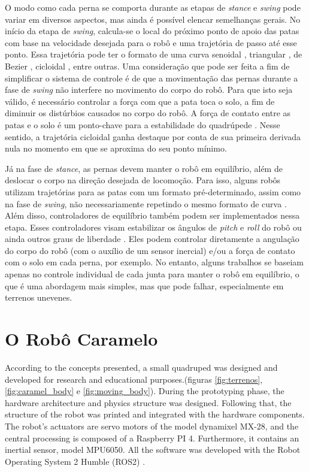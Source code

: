 \documentclass[conference]{IEEEtran}
\begin{document}
O modo como cada perna se comporta durante as etapas de \textit{stance} e \textit{swing} pode variar em diversos aspectos, mas ainda é possível elencar semelhanças gerais. No início da etapa de \textit{swing}, calcula-se o local do próximo ponto de apoio das patas com base na velocidade desejada para o robô e uma trajetória de passo até esse ponto. Essa trajetória pode ter o formato de uma curva senoidal \cite{X.118}, triangular \cite{StanfordPupper}, de Bezier \cite{HackadayQuadruped}, cicloidal \cite{Shi2021} \cite{X.58}, entre outras. Uma consideração que pode ser feita a fim de simplificar o sistema de controle é de que a movimentação das pernas durante a fase de \textit{swing} não interfere no movimento do corpo do robô. Para que isto seja válido, é necessário controlar a força com que a pata toca o solo, a fim de diminuir os distúrbios causados no corpo do robô. A força de contato entre as patas e o solo é um ponto-chave para a estabilidade do quadrúpede \cite{X.118}. Nesse sentido, a trajetória cicloidal ganha destaque por conta de sua primeira derivada nula no momento em que se aproxima do seu ponto mínimo.

Já na fase de \textit{stance}, as pernas devem manter o robô em equilíbrio, além de deslocar o corpo na direção desejada de locomoção. Para isso, alguns robôs utilizam trajetórias para as patas com um formato pré-determinado, assim como na fase de \textit{swing}, não necessariamente repetindo o mesmo formato de curva \cite{X.118, X.58}. Além disso, controladores de equilíbrio também podem ser implementados nessa etapa. Esses controladores visam estabilizar os ângulos de \textit{pitch} e \textit{roll} do robô \cite{Shi2021, StanfordPupper, HackadayQuadruped, Notspot} ou ainda outros graus de liberdade \cite{X.134, Chen2020140736, Zhang2016284}. Eles podem controlar diretamente a angulação do corpo do robô (com o auxílio de um sensor inercial) e/ou a força de contato com o solo em cada perna, por exemplo. No entanto, alguns trabalhos se baseiam apenas no controle individual de cada junta para manter o robô em equilíbrio, o que é uma abordagem mais simples, mas que pode falhar, especialmente em terrenos unevenes.

\section{O Robô Caramelo}

According to the concepts presented, a small quadruped was designed and developed for research and educational purposes.(figuras \ref{fig:terrenos}, \ref{fig:caramel_body} e \ref{fig:moving_body}).
During the prototyping phase, the hardware architecture and physics structure was designed. Following that, the structure of the robot was printed and integrated with the hardware components. The robot's actuators are servo motors of the model dynamixel MX-28, and the central processing is composed of a Raspberry PI 4. Furthermore, it contains an inertial sensor, model MPU6050. All the software was developed with the Robot Operating System 2 Humble (ROS2) \cite{ROS2Humble}.
\end{document}
